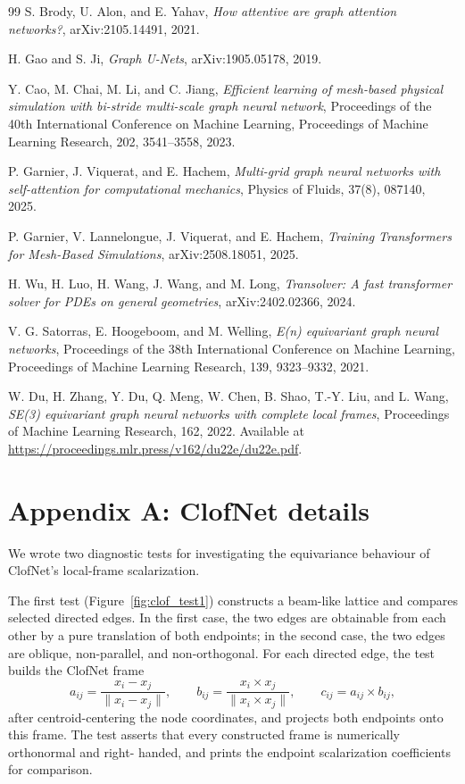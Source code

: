 \documentclass[11pt,a4paper,reqno]{amsart}
\theoremstyle{definition}
\theoremstyle{remark}
\numberwithin{equation}{section}
\begin{document}
\begin{thebibliography}{99}
S. Brody, U. Alon, and E. Yahav,
\textit{How attentive are graph attention networks?},
arXiv:2105.14491, 2021.

H. Gao and S. Ji,
\textit{Graph U-Nets},
arXiv:1905.05178, 2019.

Y. Cao, M. Chai, M. Li, and C. Jiang,
\textit{Efficient learning of mesh-based physical simulation with bi-stride multi-scale graph neural network},
Proceedings of the 40th International Conference on Machine Learning, Proceedings of Machine Learning Research, 202, 3541--3558, 2023.

P. Garnier, J. Viquerat, and E. Hachem,
\textit{Multi-grid graph neural networks with self-attention for computational mechanics},
Physics of Fluids, 37(8), 087140, 2025.

P. Garnier, V. Lannelongue, J. Viquerat, and E. Hachem,
\textit{Training Transformers for Mesh-Based Simulations},
arXiv:2508.18051, 2025.

H. Wu, H. Luo, H. Wang, J. Wang, and M. Long,
\textit{Transolver: A fast transformer solver for PDEs on general geometries},
arXiv:2402.02366, 2024.

V. G. Satorras, E. Hoogeboom, and M. Welling,
\textit{E(n) equivariant graph neural networks},
Proceedings of the 38th International Conference on Machine Learning, Proceedings of Machine Learning Research, 139, 9323--9332, 2021.

W. Du, H. Zhang, Y. Du, Q. Meng, W. Chen, B. Shao, T.-Y. Liu, and L. Wang,
\textit{SE(3) equivariant graph neural networks with complete local frames},
Proceedings of Machine Learning Research, 162, 2022. Available at
\url{https://proceedings.mlr.press/v162/du22e/du22e.pdf}.

\end{thebibliography}

\clearpage

\section*{Appendix A: ClofNet details}

We wrote two diagnostic tests for investigating the equivariance behaviour of ClofNet's local-frame scalarization. 

The first test (Figure~\ref{fig:clof_test1}) constructs a beam-like lattice and compares
selected directed edges. In the first case, the two edges are obtainable from each other by a pure translation of both endpoints; in the second case, the two edges are oblique,
non-parallel, and non-orthogonal. For each directed edge, the test builds the ClofNet frame
\[
a_{ij} = \frac{x_i - x_j}{\|x_i - x_j\|}, \qquad
b_{ij} = \frac{x_i \times x_j}{\|x_i \times x_j\|}, \qquad
c_{ij} = a_{ij} \times b_{ij},
\]
after centroid-centering the node coordinates, and projects both endpoints onto this frame. The test asserts that every constructed frame is numerically orthonormal and right-
handed, and prints the endpoint scalarization coefficients for comparison.
\end{document}
